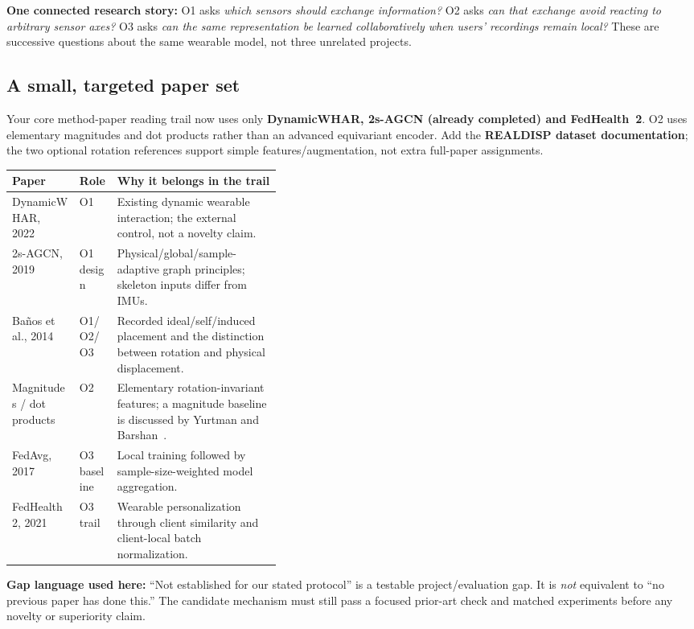 \documentclass[10pt]{article}
\begin{document}
\textbf{One connected research story:} O1 asks \emph{which sensors should exchange information?} O2 asks \emph{can that exchange avoid reacting to arbitrary sensor axes?} O3 asks \emph{can the same representation be learned collaboratively when users' recordings remain local?} These are successive questions about the same wearable model, not three unrelated projects.

\subsection*{A small, targeted paper set}
Your core method-paper reading trail now uses only \textbf{DynamicWHAR, 2s-AGCN (already completed) and FedHealth~2}. O2 uses elementary magnitudes and dot products rather than an advanced equivariant encoder. Add the \textbf{REALDISP dataset documentation}; the two optional rotation references support simple features/augmentation, not extra full-paper assignments.

\begingroup
\small
\renewcommand{\arraystretch}{1.22}
\begin{tabularx}{\linewidth}{@{}>{\raggedright\arraybackslash}p{0.25\linewidth}>{\raggedright\arraybackslash}p{0.14\linewidth}X@{}}
\toprule
\textbf{Paper} & \textbf{Role} & \textbf{Why it belongs in the trail}\\
\midrule
DynamicWHAR, 2022~\cite{omdynamic} & O1 & Existing dynamic wearable interaction; the external control, not a novelty claim.\\
2s-AGCN, 2019~\cite{omagcn} & O1 design & Physical/global/sample-adaptive graph principles; skeleton inputs differ from IMUs.\\
Ba\~nos et al., 2014~\cite{ombanos} & O1/O2/O3 & Recorded ideal/self/induced placement and the distinction between rotation and physical displacement.\\
Magnitudes / dot products & O2 & Elementary rotation-invariant features; a magnitude baseline is discussed by Yurtman and Barshan~\cite{omyurtman}.\\
FedAvg, 2017~\cite{omfedavg} & O3 baseline & Local training followed by sample-size-weighted model aggregation.\\
FedHealth 2, 2021~\cite{omfedhealth} & O3 trail & Wearable personalization through client similarity and client-local batch normalization.\\
\bottomrule
\end{tabularx}
\endgroup

\textbf{Gap language used here:} ``Not established for our stated protocol'' is a testable project/evaluation gap. It is \emph{not} equivalent to ``no previous paper has done this.'' The candidate mechanism must still pass a focused prior-art check and matched experiments before any novelty or superiority claim.
\end{document}
